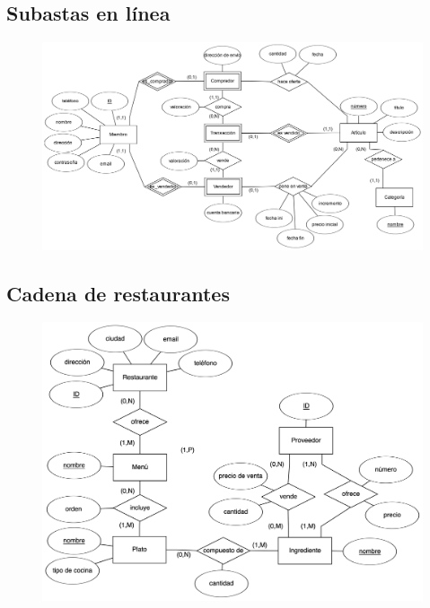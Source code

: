 \documentclass{db-practice}
\begin{document}
\subsection{Subastas en línea}
\begin{figure}[H]
    \centering
    \includegraphics[width=\textwidth]{figs/modelado/ejercicio-10}
\end{figure}

\subsection{Cadena de restaurantes}
\begin{figure}[H]
    \centering
    \includegraphics[width=\textwidth]{figs/modelado/ejercicio-11}
\end{figure}
\end{document}
